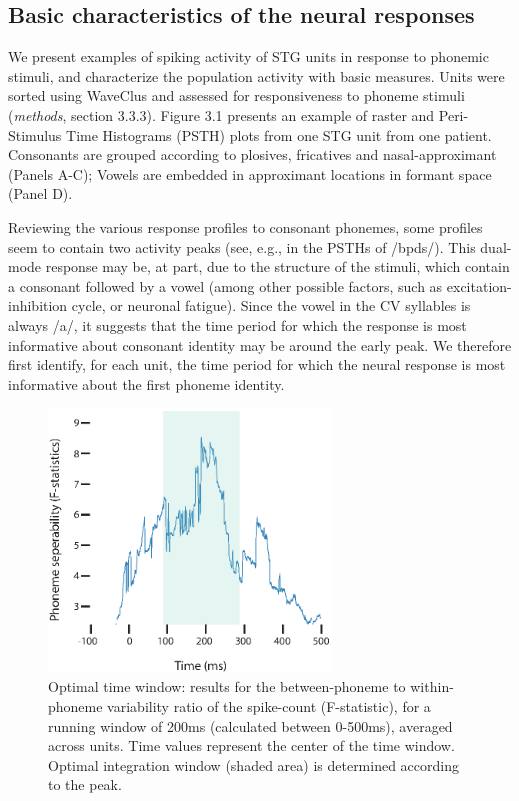 \subsection{Basic characteristics of the neural responses}
We present examples of spiking activity of STG units in response to phonemic stimuli, and characterize the population activity with basic measures. Units were sorted using WaveClus and assessed for responsiveness to phoneme stimuli (\textit{methods}, section 3.3.3). Figure 3.1 presents an example of raster and Peri-Stimulus Time Histograms (PSTH) plots from one STG unit from one patient. Consonants are grouped according to plosives, fricatives and nasal-approximant (Panels A-C); Vowels are embedded in approximant locations in formant space (Panel D). 

Reviewing the various response profiles to consonant phonemes, some profiles seem to contain two activity peaks (see, e.g., in the PSTHs of /bpds/). This dual-mode response may be, at part, due to the structure of the stimuli, which contain a consonant followed by a vowel (among other possible factors, such as excitation-inhibition cycle, or neuronal fatigue). Since the vowel in the CV syllables is always /a/, it suggests that the time period for which the response is most informative about consonant identity may be around the early peak. We therefore first identify, for each unit, the time period for which the neural response is most informative about the first phoneme identity.

\begin{figure}
\vspace{.3in}
\includegraphics[width=\linewidth, height=7cm]{Figures/Ch3/Figure1_new.eps}
\caption{Optimal time window: results for the between-phoneme to within-phoneme variability ratio of the spike-count (F-statistic), for a running window of 200ms (calculated between 0-500ms), averaged across units. Time values represent the center of the time window. Optimal integration window (shaded area) is determined according to the peak.}
\end{figure}

